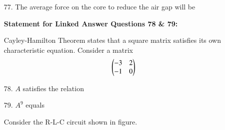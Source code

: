 \documentclass[journal,12pt,onecolumn]{IEEEtran}
\theoremstyle{remark}
\begin{document}
\begin{enumerate}
    \item [77.] The average force on the core to reduce the air gap will be
    \begin{enumerate}
    \end{enumerate}


\textbf{Statement for Linked Answer Questions 78 \& 79:}

Cayley-Hamilton Theorem states that a square matrix satisfies its own characteristic equation. Consider a matrix
\begin{align}
\begin{pmatrix} -3 & 2 \\
         -1 & 0 \end{pmatrix} 
\end{align}


    \item [78.] $A$ satisfies the relation
    \begin{enumerate}
    \end{enumerate}

    \item [79.] $A^9$ equals
    \begin{enumerate}
    \end{enumerate}




Consider the R-L-C circuit shown in figure.

\begin{figure}[!ht]
\centering
\resizebox{0.4\textwidth}{!}{}
\end{figure}



\end{enumerate}
\end{document}
